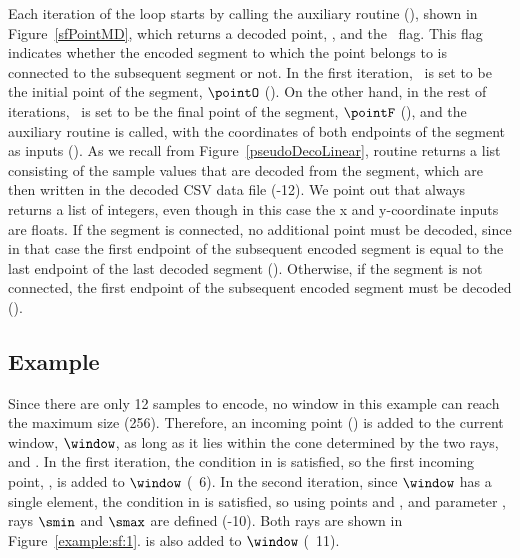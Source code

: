 Each iteration of the loop starts by calling the auxiliary routine \SFDecodePoint (), shown in Figure~\ref{sfPointMD}, which returns a decoded point, \pointP, and the \connected\ flag. This flag indicates whether the encoded segment to which the point belongs to is connected to the subsequent segment or not.  In the first iteration, \pointP\ is set to be the initial point of the segment, $\pointO$ (). On the other hand, in the rest of iterations, \pointP\ is set to be the final point of the segment, $\pointF$ (), and the auxiliary routine \decodeSegment is called, with the coordinates of both endpoints of the segment as inputs (). As we recall from Figure~\ref{pseudoDecoLinear}, routine \decodeSegment returns a list consisting of the sample values that are decoded from the segment, which are then written in the decoded CSV data file (-12). We point out that \decodeSegment always returns a list of integers, even though in this case the x and y-coordinate inputs are floats. If the segment is connected, no additional point must be decoded, since in that case the first endpoint of the subsequent encoded segment is equal to the last endpoint of the last decoded segment (). Otherwise, if the segment is not connected, the first endpoint of the subsequent encoded segment must be decoded ().




        


\clearpage
\subsection{Example}
\label{algo:sf:example}


\vspace{+5pt}
\exampleIntro{\ref{example:sf:1}}


Since there are only 12 samples to encode, no window in this example can reach the maximum size (256). Therefore, an incoming point (\incoming) is added to the current window, $\window$, as long as it lies within the cone determined by the two rays, \smin and \smax. In the first iteration, the condition in  is satisfied, so the first incoming point, , is added to $\window$ (\Line~6). In the second iteration, since $\window$ has a single element, the condition in  is satisfied, so using points \snapshot and , and parameter \maxerror, rays $\smin$ and $\smax$ are defined (-10). Both rays are shown in Figure~\ref{example:sf:1}.  is also added to $\window$ (\Line~11). 


